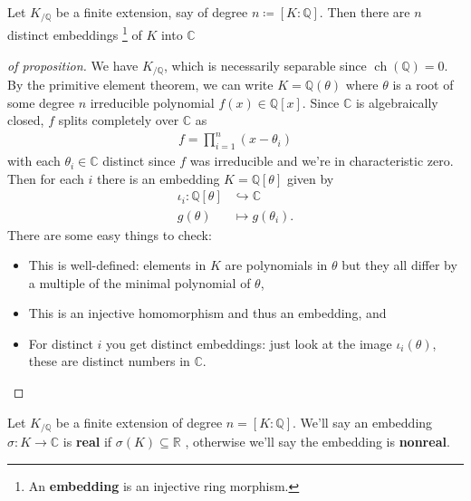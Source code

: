 \begin{proposition}

Let \(K_{/{\mathbb{Q}}}\) be a finite extension, say of degree
\(n\coloneqq[K: {\mathbb{Q}}]\). Then there are \(n\) distinct
embeddings \footnote{An \textbf{embedding} is an injective ring
  morphism.} of \(K\) into \({\mathbb{C}}\)

\end{proposition}

\begin{proof}[of proposition]

We have \(K_{/{\mathbb{Q}}}\), which is necessarily separable since
\(\operatorname{ch}({\mathbb{Q}}) = 0\). By the primitive element
theorem, we can write \(K = {\mathbb{Q}}(\theta)\) where \(\theta\) is a
root of some degree \(n\) irreducible polynomial
\(f(x) \in {\mathbb{Q}}[x]\). Since \({\mathbb{C}}\) is algebraically
closed, \(f\) splits completely over \({\mathbb{C}}\) as
\begin{align*}
f = \prod_{i=1}^n (x- \theta_i) 
\end{align*}
with each \(\theta_i \in {\mathbb{C}}\) distinct since \(f\) was
irreducible and we're in characteristic zero. Then for each \(i\) there
is an embedding \(K = {\mathbb{Q}}[\theta]\) given by
\begin{align*}
\iota_i: {\mathbb{Q}}[\theta] &\hookrightarrow{\mathbb{C}}\\
g(\theta) &\mapsto g(\theta_i)
.\end{align*}
There are some easy things to check:

\begin{itemize}
\tightlist
\item
  This is well-defined: elements in \(K\) are polynomials in \(\theta\)
  but they all differ by a multiple of the minimal polynomial of
  \(\theta\),
\item
  This is an injective homomorphism and thus an embedding, and
\item
  For distinct \(i\) you get distinct embeddings: just look at the image
  \(\iota_i(\theta)\), these are distinct numbers in \({\mathbb{C}}\).
\end{itemize}

\end{proof}

\begin{definition}

Let \(K_{/{\mathbb{Q}}}\) be a finite extension of degree
\(n = [K : {\mathbb{Q}}]\). We'll say an embedding
\(\sigma:K \to {\mathbb{C}}\) is \textbf{real} if
\(\sigma(K) \subseteq {\mathbb{R}}\) , otherwise we'll say the embedding
is \textbf{nonreal}.

\end{definition}

